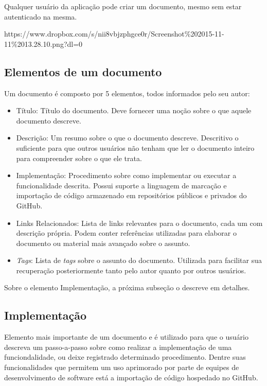 Qualquer usuário da aplicação pode criar um documento, mesmo sem estar autenticado na mesma.

https://www.dropbox.com/s/nii8vbjzphgce0r/Screenshot\%202015-11-11\%2013.28.10.png?dl=0

\subsection{Elementos de um documento}

Um documento é composto por 5 elementos, todos informados pelo seu autor:

\begin{itemize}
  \item Título: Título do documento. Deve fornecer uma noção sobre o que aquele documento descreve.
  \item Descrição: Um resumo sobre o que o documento descreve. Descritivo o suficiente para que outros usuários não tenham que ler o documento inteiro para compreender sobre o que ele trata.
  \item Implementação: Procedimento sobre como implementar ou executar a funcionalidade descrita. Possui suporte a linguagem de marcação e importação de código armazenado em repositórios públicos e privados do GitHub.
  \item Links Relacionados: Lista de links relevantes para o documento, cada um com descrição própria. Podem conter referências utilizadas para elaborar o documento ou material mais avançado sobre o assunto.
  \item \textit{Tags}: Lista de \textit{tags} sobre o assunto do documento. Utilizada para facilitar sua recuperação posteriormente tanto pelo autor quanto por outros usuários.
\end{itemize}

Sobre o elemento Implementação, a próxima subseção o descreve em detalhes.

\subsection{Implementação}

Elemento mais importante de um documento e é utilizado para que o usuário descreva um passo-a-passo sobre
como realizar a implementação de uma funciondalidade, ou deixe registrado determinado procedimento. Dentre suas funcionalidades que permitem um uso aprimorado por parte de equipes de desenvolvimento de software está a importação de código hospedado no GitHub.

